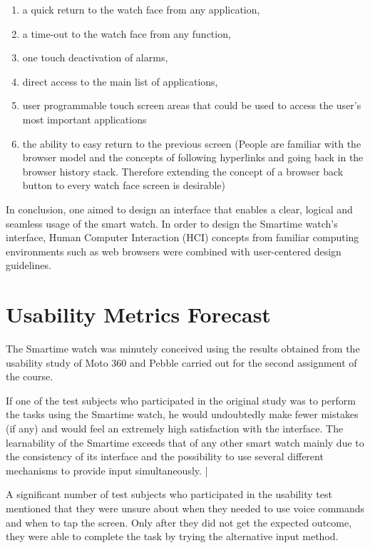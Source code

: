\documentclass{article}
\begin{document}
\begin{enumerate}
\item a quick return to the watch face from any application, 
\item a time-out to the watch face from any function,
\item one touch deactivation of alarms, 
\item direct access to the main list of applications, 
\item user programmable touch screen areas that could be used to access the user's most important applications
\item the ability to easy return to the previous screen (People are familiar with the browser model and the concepts of following hyperlinks and going back in the browser history stack. Therefore extending the concept of a browser back button to every watch face screen is desirable)
\end{enumerate}

In conclusion, one aimed to design an interface that enables a clear, logical and seamless usage of the smart watch. In order to design the Smartime watch's interface, Human Computer Interaction (HCI) concepts from familiar computing environments such as web browsers were combined with user-centered design guidelines.


\section{Usability Metrics Forecast}
The Smartime watch was minutely conceived using the results obtained from the usability study of Moto 360 and Pebble carried out for the second assignment of the course. \cite{loustau2014} 

If one of the test subjects who participated in the original study was to perform the tasks using the Smartime watch, he would undoubtedly make fewer mistakes (if any) and would feel an extremely high satisfaction with the interface. The learnability of the Smartime exceeds that of any other smart watch mainly due to the consistency of its interface and the possibility to use several different mechanisms to provide input simultaneously. \cite{akers2014}|

A significant number of test subjects who participated in the usability test mentioned that they were unsure about when they needed to use voice commands and when to tap the screen. Only after they did not get the expected outcome, they were able to complete the task by trying the alternative input method.
\end{document}
